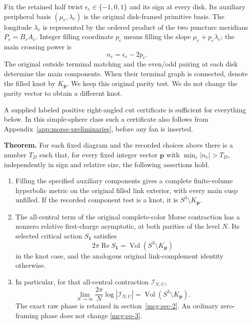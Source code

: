 Fix the retained half twist \(\epsilon_e\in\{-1,0,1\}\) and its sign at
every disk. Its auxiliary peripheral basis \((\mu_e,\lambda_e)\) is the
original disk-framed primitive basis. The longitude \(\lambda_e\) is
represented by the ordered product of the two puncture meridians \(P_e=B_eA_e\). Integer
filling coordinate \(p_e\) means filling the slope
\(\mu_e+p_e\lambda_e\); the main crossing power is \begin{equation}\label{mcg:eq-1}
n_e=\epsilon_e-2p_e.
\end{equation} The original outside terminal matching and the even/odd pairing at
each disk determine the main components. When their terminal graph is
connected, denote the filled knot by \(K_{\boldsymbol p}\). We keep this
original parity test. We do not change the parity vector to obtain a
different knot.

A supplied labeled positive right-angled cut certificate is sufficient
for everything below. In this simple-sphere class such a certificate
also follows from Appendix~\ref{app:morse-preliminaries}, before any fan is inserted.

\textbf{Theorem.} For each fixed diagram and the recorded choices above
there is a number \(T_D\) such that, for every fixed integer vector
\(\boldsymbol p\) with \(\min_e|n_e|>T_D\), independently in sign and
relative size, the following assertions hold.

\begin{enumerate}
\def\labelenumi{\arabic{enumi}.}
\item
  Filling the specified auxiliary components gives a complete
  finite-volume hyperbolic metric on the original filled link exterior,
  with every main cusp unfilled. If the recorded component test is a
  knot, it is \(S^3\setminus K_{\boldsymbol p}\).
\item
  The all-central term of the original complete-color Morse contraction
  has a nonzero relative first-charge asymptotic, at both parities of
  the level \(N\). Its selected critical action \(S_{\boldsymbol 1}\)
  satisfies \begin{equation}\label{mcg:eq-2}
2\pi\operatorname{Re}S_{\boldsymbol 1}
         =\operatorname{Vol}(S^3\setminus K_{\boldsymbol p})
\end{equation} in the knot case, and the analogous original link-complement
  identity otherwise.
\item
  In particular, for that all-central contraction
  \(\mathcal I_{N,\mathrm C}\), \begin{equation}\label{mcg:eq-3}
\lim_{N\to\infty}\frac{2\pi}{N}
           \log|\mathcal I_{N,\mathrm C}|
         =\operatorname{Vol}(S^3\setminus K_{\boldsymbol p}).
\end{equation} The exact raw phase is retained in
  section~\ref{mcg:sec-2}. An ordinary zero-framing
  phase does not change \eqref{mcg:eq-3}.
\end{enumerate}

